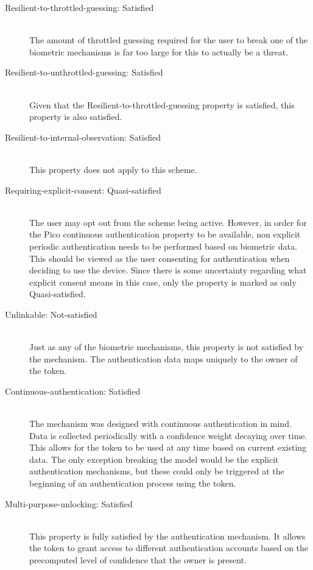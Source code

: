 \begin{description}
  \item[Resilient-to-throttled-guessing: Satisfied] \hfill \\
  The amount of throttled guessing required for the user to break one of the biometric mechanisms is far too large for this to actually be a threat.
  
  \item[Resilient-to-unthrottled-guessing: Satisfied] \hfill \\
  Given that the Resilient-to-throttled-guessing property is satisfied, this property is also satisfied.
  
  \item[Resilient-to-internal-observation: Satisfied] \hfill \\
  This property does not apply to this scheme. 
  
  \item[Requiring-explicit-consent: Quasi-satisfied] \hfill \\
  The user may opt out from the scheme being active. However, in order for the Pico continuous authentication property to be available, non explicit periodic authentication needs to be performed based on biometric data. This should be viewed as the user consenting for authentication when deciding to use the device. Since there is some uncertainty regarding what explicit consent means in this case, only the property is marked as only Quasi-satisfied.
  
  \item[Unlinkable: Not-satisfied] \hfill \\
  Just as any of the biometric mechanisms, this property is not satisfied by the mechanism. The authentication data maps uniquely to the owner of the token.
  
  \item[Continuous-authentication: Satisfied] \hfill \\
  The mechanism was designed with continuous authentication in mind. Data is collected periodically with a confidence weight decaying over time. This allows for the token to be used at any time based on current existing data. The only exception breaking the model would be the explicit authentication mechanisms, but these could only be triggered at the beginning of an authentication process using the token.
  
  \item[Multi-purpose-unlocking: Satisfied] \hfill \\
  This property is fully satisfied by the authentication mechanism. It allows the token to grant access to different authentication accounts based on the precomputed level of confidence that the owner is present. 
  

\end{description}
